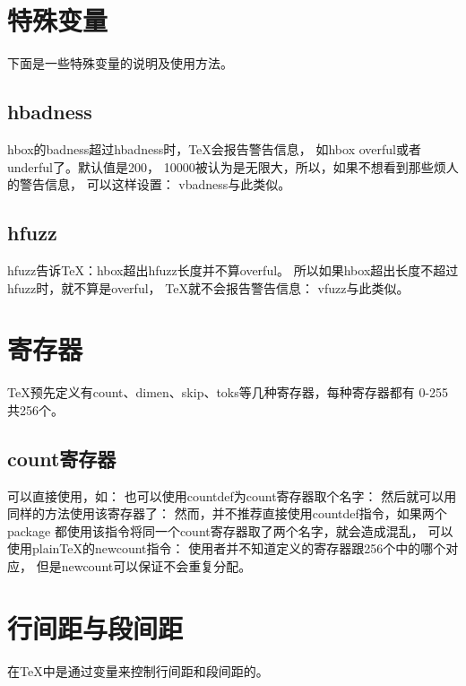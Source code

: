 \documentclass{article}
\begin{document}
  \section[特殊变量]{特殊变量}
  下面是一些特殊变量的说明及使用方法。

  \subsection[hbadness]{\bs hbadness}
  \bs hbox的badness超过hbadness时，\TeX{}会报告警告信息，
  如\bs hbox overful或者underful了。默认值是200，
  10000被认为是无限大，所以，如果不想看到那些烦人的警告信息，
  可以这样设置：
  \bs vbadness与此类似。

  \subsection[hfuzz]{\bs hfuzz}
  \bs hfuzz告诉\TeX{}：\bs hbox超出\bs hfuzz长度并不算overful。
  所以如果\bs hbox超出长度不超过\bs hfuzz时，就不算是overful，
  \TeX{}就不会报告警告信息：
  \bs vfuzz与此类似。


  \section[寄存器]{寄存器}
  \TeX{}预先定义有count、dimen、skip、toks等几种寄存器，每种寄存器都有
  0-255共256个。

  \subsection[count寄存器]{count寄存器}
  可以直接使用，如：
  也可以使用\bs countdef为count寄存器取个名字：
  然后就可以用同样的方法使用该寄存器了：
  然而，并不推荐直接使用\bs countdef指令，如果两个package
  都使用该指令将同一个count寄存器取了两个名字，就会造成混乱，
  可以使用plain\TeX{}的\bs newcount指令：
  使用者并不知道定义的寄存器跟256个中的哪个对应，
  但是\bs newcount可以保证不会重复分配。

  \section[行间距与段间距]{行间距与段间距}
  在\TeX{}中是通过变量来控制行间距和段间距的。
\end{document}
